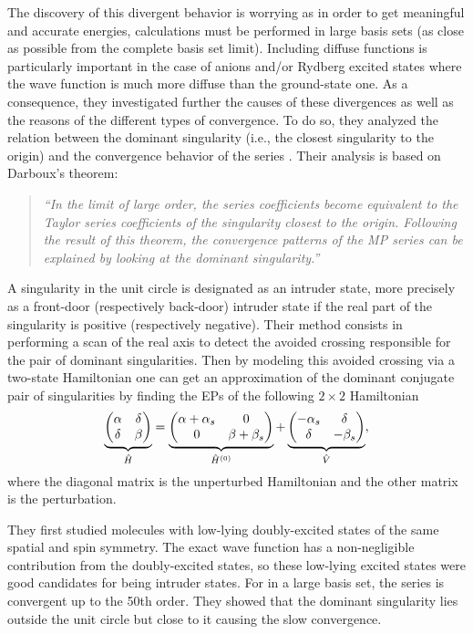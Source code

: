 \documentclass[11pt,a4paper]{article}
\newcommand{\titou}[1]{\textcolor{red}{#1}}
\newcommand{\hH}{\Hat{H}}
\newcommand{\hV}{\Hat{V}}
\begin{document}
The discovery of this divergent behavior is worrying as in order to get meaningful and accurate energies, calculations must be performed in large basis sets (as close as possible from the complete basis set limit). Including diffuse functions is particularly important in the case of anions and/or Rydberg excited states where the wave function is much more diffuse than the ground-state one. As a consequence, they investigated further the causes of these divergences as well as the reasons of the different types of convergence. To do so, they analyzed the relation between the dominant singularity (i.e., the closest singularity to the origin) and the convergence behavior of the series \cite{Olsen_2000}. Their analysis is based on Darboux's theorem: 
\begin{quote}
	\textit{``In the limit of large order, the series coefficients become equivalent to the Taylor series coefficients of the singularity closest to the origin. Following the result of this theorem, the convergence patterns of the MP series can be explained by looking at the dominant singularity.''}
\end{quote}

A singularity in the unit circle is designated as an intruder state, more precisely as a front-door (respectively back-door) intruder state if the real part of the singularity is positive (respectively negative). Their method consists in performing a scan of the real axis to detect the avoided crossing responsible for the pair of dominant singularities. Then by modeling this avoided crossing via a two-state Hamiltonian one can get an approximation of the dominant conjugate pair of singularities by finding the EPs of the following $2\times2$ Hamiltonian
\begin{equation}
\underbrace{\mqty(\alpha & \delta \\ \delta & \beta)}_{\hH} = \underbrace{\mqty(\alpha + \alpha_s & 0 \\ 0 & \beta + \beta_s )}_{\hH^{(0)}} + \underbrace{\mqty(- \alpha_s & \delta \\ \delta & - \beta_s)}_{\hV},
\end{equation}
where the diagonal matrix is the unperturbed Hamiltonian and the other matrix is the perturbation.

They first studied molecules with low-lying doubly-excited states of the same spatial and spin symmetry.
The exact wave function has a non-negligible contribution from the doubly-excited states, so these low-lying excited states were good candidates for being intruder states. For  in a large basis set, the series is convergent up to the 50th order. They showed that the dominant singularity lies outside the unit circle but close to it causing the slow convergence.
\end{document}

